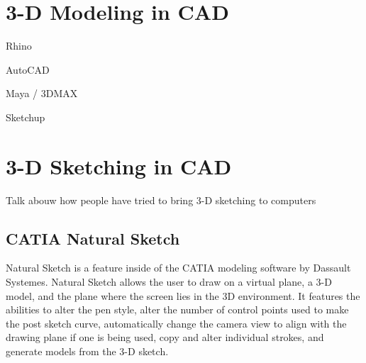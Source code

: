 \documentclass[12pt]{report}
\begin{document}
\section{3-D Modeling in CAD}

Rhino

AutoCAD

Maya / 3DMAX

Sketchup

\section{3-D Sketching in CAD}

Talk abouw how people have tried to bring 3-D sketching to computers

\subsection{CATIA Natural Sketch}

Natural Sketch is a feature inside of the CATIA modeling software by Dassault Systemes. Natural Sketch allows the user to draw on a virtual plane, a 3-D model, and the plane where the screen lies in the 3D environment. It features the abilities to alter the pen style, alter the number of control points used to make the post sketch curve, automatically change the camera view to align with the drawing plane if one is being used, copy and alter individual strokes, and generate models from the 3-D sketch.
\end{document}
